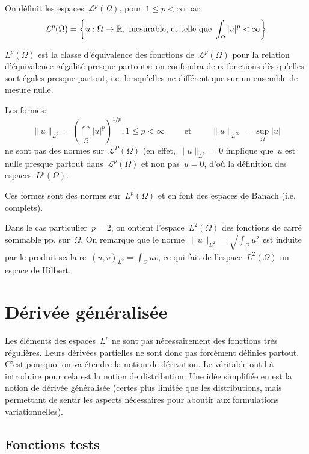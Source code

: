 On définit les espaces~$\mathcal{L}^p(\Omega)$, pour~$1\le p<\infty$ par:
\[
\mathcal{L}^p(\Omega)=\left\{u:\Omega\rightarrow\mathbb R, \text{ mesurable, et telle que }
\displaystyle\int_\Omega|u|^p<\infty\right\}
\]

\medskip
$L^p(\Omega)$ est la classe d'équivalence des fonctions de~$\mathcal{L}^ p(\Omega)$ pour la relation d'équivalence «égalité presque partout»: on confondra deux fonctions dès qu'elles sont égales presque partout, i.e. lorsqu'elles ne différent que sur un ensemble de mesure nulle.

Les formes:
\[
\|u\|_{L^p}=\left(\dint_\Omega |u|^p\right)^{1/p}, 1\le p<\infty \qquad \text{ et }
\qquad \|u\|_{L^\infty}=\sup_\Omega |u|
\]
ne sont pas des normes sur~$\mathcal{L}^P(\Omega)$ (en effet, $\|u\|_{L^p}=0$ implique que~$u$ est nulle presque partout dans~$\mathcal{L}^p(\Omega)$ et non pas~$u = 0$, d'où la définition des espaces~$L^p(\Omega)$.

Ces formes sont des normes sur~$L^p(\Omega)$ et en font des espaces de Banach (i.e. complets).

\medskip
Dans le cas particulier~$p=2$, on ontient l'espace~$L^2(\Omega)$ des fonctions de carré sommable pp. sur~$\Omega$. On remarque que le norme~$\|u\|_{L^2}=\sqrt{\int_\Omega u^2}$ est induite par le produit scalaire~$(u,v)_{L^2}=\int_\Omega uv$, ce qui fait de l'espace~$L^2(\Omega)$ un espace de Hilbert.





\medskip
\section*{Dérivée généralisée}

Les éléments des espaces~$L^p$ ne sont pas nécessairement des fonctions très régulières.
Leurs dérivées partielles ne sont donc pas forcément définies partout.
C'est pourquoi on va étendre la notion de dérivation. 
Le véritable outil à introduire pour cela est la notion de distribution.
Une idée simplifiée en est la notion de dérivée généralisée (certes plus limitée que les distributions, mais permettant de sentir les aspects nécessaires pour aboutir aux formulations variationnelles).

\medskip
\subsection*{Fonctions tests}

